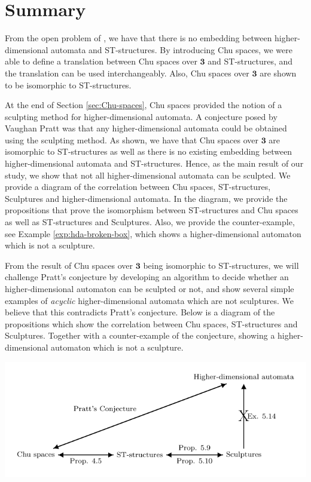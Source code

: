 \section{Summary}
\label{sec:summary-4-relationship}

    From the open problem of \cite{Johansen16STstruct}, we have that there is no embedding between higher-dimensional automata and ST-structures. By introducing Chu spaces, we were able to define a translation between Chu spaces over $\mathbf{3}$ and ST-structures, and the translation can be used interchangeably. Also, Chu spaces over $\mathbf{3}$ are shown to be isomorphic to ST-structures.
    
    At the end of Section \ref{sec:Chu-spaces}, Chu spaces provided the notion of a sculpting method for higher-dimensional automata. A conjecture posed by Vaughan Pratt was that any higher-dimensional automata could be obtained using the sculpting method. As shown, we have that Chu spaces over $\mathbf{3}$ are isomorphic to ST-structures as well as there is no existing embedding between higher-dimensional automata and ST-structures. Hence, as the main result of our study, we show that not all higher-dimensional automata can be sculpted. We provide a diagram of the correlation between Chu spaces, ST-structures, Sculptures and higher-dimensional automata. In the diagram, we provide the propositions that prove the isomorphism between ST-structures and Chu spaces as well as ST-structures and Sculptures. Also, we provide the counter-example, see Example \ref{exp:hda-broken-box}, which shows a higher-dimensional automaton which is not a sculpture.
    
    
    From the result of Chu spaces over $\mathbf{3}$ being isomorphic to ST-structures, we will challenge Pratt's conjecture by developing an algorithm to decide whether an higher-dimensional automaton can be sculpted or not, and show several simple examples of \emph{acyclic} higher-dimensional automata which are not sculptures. We believe that this contradicts Pratt's conjecture. Below is a diagram of the propositions which show the correlation between Chu spaces, ST-structures and Sculptures. Together with a counter-example of the conjecture, showing a higher-dimensional automaton which is not a sculpture.

    \begin{center}
        \includegraphics[scale=1]{Figures/4.Relationship-with-other-models-of-concurrency/Chu-spaces-and-ST-structures/argument-diagram.pdf}
    \end{center}
    
